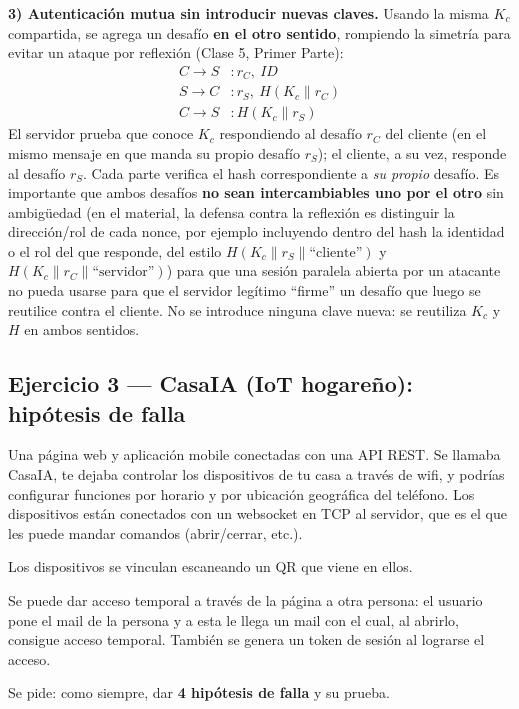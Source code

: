 \textbf{3) Autenticación mutua sin introducir nuevas claves.}
Usando la misma $K_c$ compartida, se agrega un desafío \textbf{en el otro
sentido}, rompiendo la simetría para evitar un ataque por reflexión (Clase 5,
Primer Parte):
\begin{align*}
C \to S &: r_C,\ ID\\
S \to C &: r_S,\ H(K_c \| r_C)\\
C \to S &: H(K_c \| r_S)
\end{align*}
El servidor prueba que conoce $K_c$ respondiendo al desafío $r_C$ del cliente
(en el mismo mensaje en que manda su propio desafío $r_S$); el cliente, a su vez,
responde al desafío $r_S$. Cada parte verifica el hash correspondiente a \emph{su
propio} desafío. Es importante que ambos desafíos \textbf{no sean intercambiables
uno por el otro} sin ambigüedad (en el material, la defensa contra la reflexión es
distinguir la dirección/rol de cada nonce, por ejemplo incluyendo dentro del hash
la identidad o el rol del que responde, del estilo $H(K_c\|r_S\|\text{``cliente''})$
y $H(K_c\|r_C\|\text{``servidor''})$) para que una sesión paralela abierta por un
atacante no pueda usarse para que el servidor legítimo ``firme'' un desafío que
luego se reutilice contra el cliente. No se introduce ninguna clave nueva: se
reutiliza $K_c$ y $H$ en ambos sentidos.

\subsection{Ejercicio 3 --- CasaIA (IoT hogareño): hipótesis de falla}

\begin{consigna}
Una página web y aplicación mobile conectadas con una API REST. Se llamaba CasaIA,
te dejaba controlar los dispositivos de tu casa a través de wifi, y podrías
configurar funciones por horario y por ubicación geográfica del teléfono. Los
dispositivos están conectados con un websocket en TCP al servidor, que es el que
les puede mandar comandos (abrir/cerrar, etc.).

Los dispositivos se vinculan escaneando un QR que viene en ellos.

Se puede dar acceso temporal a través de la página a otra persona: el usuario pone
el mail de la persona y a esta le llega un mail con el cual, al abrirlo, consigue
acceso temporal. También se genera un token de sesión al lograrse el acceso.

Se pide: como siempre, dar \textbf{4 hipótesis de falla} y su prueba.
\end{consigna}

